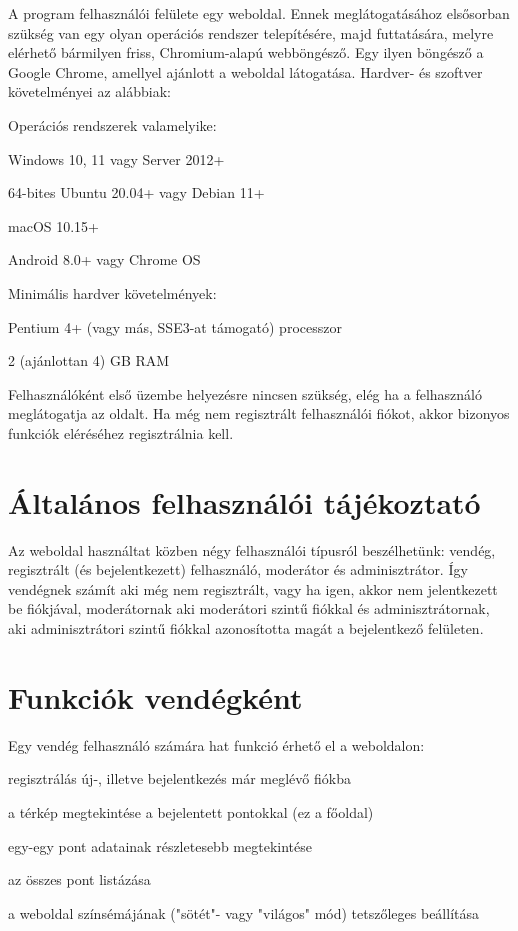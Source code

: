 A program felhasználói felülete egy weboldal. Ennek meglátogatásához elsősorban szükség van egy olyan operációs rendszer telepítésére, majd futtatására, melyre elérhető bármilyen friss, Chromium-alapú webböngésző. Egy ilyen böngésző a Google Chrome, amellyel ajánlott a weboldal látogatása. Hardver- és szoftver követelményei az alábbiak:
\begin{compactitem}
	\item Operációs rendszerek valamelyike:
	\begin{compactitem}
		\item Windows 10, 11 vagy Server 2012+
		\item 64-bites Ubuntu 20.04+ vagy Debian 11+
		\item macOS 10.15+
		\item Android 8.0+ vagy Chrome OS
	\end{compactitem}
	\item Minimális hardver követelmények:
	\begin{compactitem}
		\item Pentium 4+ (vagy más, SSE3-at támogató) processzor
		\item 2 (ajánlottan 4) GB RAM
	\end{compactitem}
\end{compactitem}

Felhasználóként első üzembe helyezésre nincsen szükség, elég ha a felhasználó meglátogatja az oldalt. Ha még nem regisztrált felhasználói fiókot, akkor bizonyos funkciók eléréséhez regisztrálnia kell.

\section{Általános felhasználói tájékoztató}

Az weboldal használtat közben négy felhasználói típusról beszélhetünk: vendég, regisztrált (és bejelentkezett) felhasználó, moderátor és adminisztrátor. Így vendégnek számít aki még nem regisztrált, vagy ha igen, akkor nem jelentkezett be fiókjával, moderátornak aki moderátori szintű fiókkal és adminisztrátornak, aki adminisztrátori szintű fiókkal azonosította magát a bejelentkező felületen.
\newpage

\section{Funkciók vendégként}

\noindent Egy vendég felhasználó számára hat funkció érhető el a weboldalon:
\begin{compactitem}
	\item regisztrálás új-, illetve bejelentkezés már meglévő fiókba
	\item a térkép megtekintése a bejelentett pontokkal (ez a főoldal)
	\item egy-egy pont adatainak részletesebb megtekintése
	\item az összes pont listázása
	\item a weboldal színsémájának ("sötét"- vagy "világos" mód) tetszőleges beállítása
\end{compactitem}

